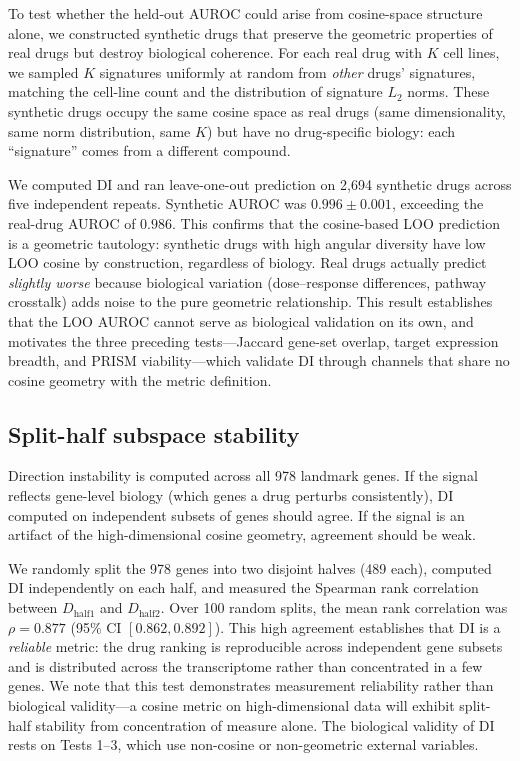 \documentclass[11pt]{article}
\begin{document}
To test whether the held-out AUROC could arise from cosine-space
structure alone, we constructed synthetic drugs that preserve the
geometric properties of real drugs but destroy biological coherence.
For each real drug with $K$ cell lines, we sampled $K$ signatures
uniformly at random from \emph{other} drugs' signatures, matching the
cell-line count and the distribution of signature $L_2$ norms.  These
synthetic drugs occupy the same cosine space as real drugs (same
dimensionality, same norm distribution, same $K$) but have no
drug-specific biology: each ``signature'' comes from a different
compound.

We computed DI and ran leave-one-out prediction on
2{,}694 synthetic drugs across five independent repeats.  Synthetic AUROC was
$0.996 \pm 0.001$, exceeding the real-drug AUROC of $0.986$.  This
confirms that the cosine-based LOO prediction is a geometric tautology:
synthetic drugs with high angular diversity have low LOO cosine by
construction, regardless of biology.  Real drugs actually predict
\emph{slightly worse} because biological variation (dose--response
differences, pathway crosstalk) adds noise to the pure geometric
relationship.  This result establishes that the LOO AUROC cannot serve
as biological validation on its own, and motivates the three preceding
tests---Jaccard gene-set overlap, target expression breadth, and PRISM
viability---which validate DI through channels that share no cosine
geometry with the metric definition.

\subsection{Split-half subspace stability}

Direction instability is computed across all 978 landmark genes.  If
the signal reflects gene-level biology (which genes a drug perturbs
consistently), DI computed on independent subsets of genes should agree.
If the signal is an artifact of the high-dimensional cosine geometry,
agreement should be weak.

We randomly split the 978 genes into two disjoint halves (489 each),
computed DI independently on each half, and measured the Spearman
rank correlation between $D_{\text{half1}}$ and $D_{\text{half2}}$.
Over 100 random splits, the mean rank correlation was
$\rho = 0.877$
(95\% CI $[0.862,
0.892]$).  This high agreement establishes that DI is a \emph{reliable}
metric: the drug ranking is reproducible across independent gene subsets
and is distributed across the transcriptome rather than concentrated in
a few genes.  We note that this test demonstrates measurement
reliability rather than biological validity---a cosine metric on
high-dimensional data will exhibit split-half stability from
concentration of measure alone.  The biological validity of DI rests on
Tests 1--3, which use non-cosine or non-geometric external variables.
\end{document}
